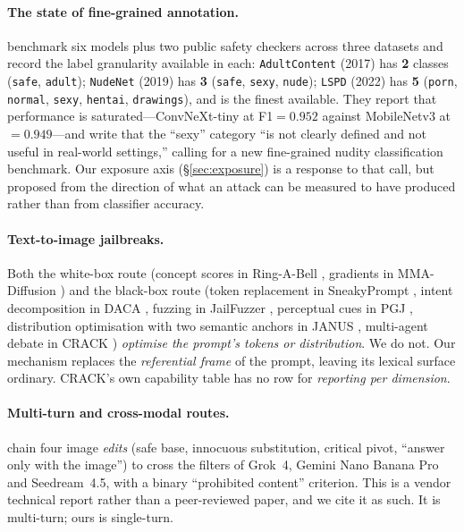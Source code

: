 \documentclass[11pt]{article}
\begin{document}
\paragraph{The state of fine-grained annotation.}
\citet{nuditysota} benchmark six models plus two public safety checkers across
three datasets and record the label granularity available in each:
\texttt{AdultContent} (2017) has \textbf{2} classes (\texttt{safe},
\texttt{adult}); \texttt{NudeNet} (2019) has \textbf{3} (\texttt{safe},
\texttt{sexy}, \texttt{nude}); \texttt{LSPD} (2022) has \textbf{5}
(\texttt{porn}, \texttt{normal}, \texttt{sexy}, \texttt{hentai},
\texttt{drawings}), and is the finest available. They report that performance
is saturated---ConvNeXt-tiny at F1${=}0.952$ against MobileNetv3 at
${=}0.949$---and write that the ``sexy'' category ``is not clearly defined and
not useful in real-world settings,'' calling for a new fine-grained nudity
classification benchmark. Our exposure axis (\S\ref{sec:exposure}) is a
response to that call, but proposed from the direction of what an attack can be
measured to have produced rather than from classifier accuracy.

\paragraph{Text-to-image jailbreaks.}
Both the white-box route (concept scores in Ring-A-Bell \citep{ringabell},
gradients in MMA-Diffusion \citep{mmadiffusion}) and the black-box route
(token replacement in SneakyPrompt \citep{sneakyprompt}, intent decomposition
in DACA \citep{daca}, fuzzing in JailFuzzer \citep{jailfuzzer}, perceptual cues
in PGJ \citep{pgj}, distribution optimisation with two semantic anchors in
JANUS \citep{janus}, multi-agent debate in CRACK \citep{crack}) \emph{optimise
the prompt's tokens or distribution}. We do not. Our mechanism replaces the
\emph{referential frame} of the prompt, leaving its lexical surface ordinary.
CRACK's own capability table has no row for \emph{reporting per dimension}.

\paragraph{Multi-turn and cross-modal routes.}
\citet{semanticchaining} chain four image \emph{edits} (safe base, innocuous
substitution, critical pivot, ``answer only with the image'') to cross the
filters of Grok~4, Gemini Nano Banana Pro and Seedream~4.5, with a binary
``prohibited content'' criterion. This is a vendor technical report rather than
a peer-reviewed paper, and we cite it as such. It is multi-turn; ours is
single-turn.
\end{document}

